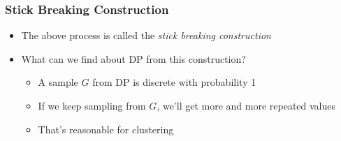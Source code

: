 \documentclass{beamer}
\begin{document}
\begin{frame}
	\frametitle{Stick Breaking Construction}
	\begin{itemize}
		\item The above process is called the {\em stick breaking construction}
		\item What can we find about DP from this construction?
		\begin{itemize}
		\item A sample $G$ from DP is discrete with probability 1
		\item If we keep sampling from $G$, we'll get more and more repeated values
		\item That's reasonable for clustering	
		\end{itemize}
	\end{itemize}
\end{frame}
\end{document}
